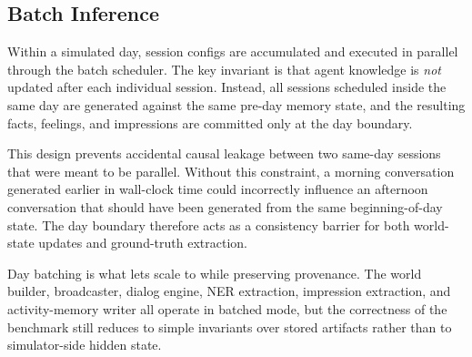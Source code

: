 
\subsection{Batch Inference}
\label{app:batch-inference}

Within a simulated day, session configs are accumulated and executed in parallel through the batch scheduler.
The key invariant is that agent knowledge is \emph{not} updated after each individual session.
Instead, all sessions scheduled inside the same day are generated against the same pre-day memory state, and the resulting facts, feelings, and impressions are committed only at the day boundary.

This design prevents accidental causal leakage between two same-day sessions that were meant to be parallel.
Without this constraint, a morning conversation generated earlier in wall-clock time could incorrectly influence an afternoon conversation that should have been generated from the same beginning-of-day state.
The day boundary therefore acts as a consistency barrier for both world-state updates and ground-truth extraction.

Day batching is what lets \masim scale to \benchL while preserving provenance.
The world builder, broadcaster, dialog engine, NER extraction, impression extraction, and activity-memory writer all operate in batched mode, but the correctness of the benchmark still reduces to simple invariants over stored artifacts rather than to simulator-side hidden state.

